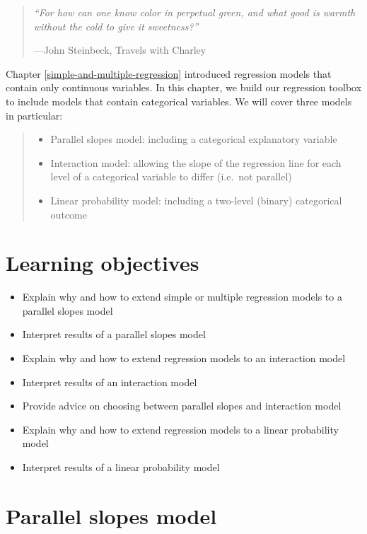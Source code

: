 \documentclass[
]{book}
\providecommand{\tightlist}{%
  \setlength{\itemsep}{0pt}\setlength{\parskip}{0pt}}
\begin{document}
\begin{quote}
\emph{``For how can one know color in perpetual green, and what good is warmth without the cold to give it sweetness?''}

---John Steinbeck, Travels with Charley
\end{quote}

Chapter \ref{simple-and-multiple-regression} introduced regression models that contain only continuous variables. In this chapter, we build our regression toolbox to include models that contain categorical variables. We will cover three models in particular:

\begin{quote}
\begin{itemize}
\tightlist
\item
  Parallel slopes model: including a categorical explanatory variable
\item
  Interaction model: allowing the slope of the regression line for each level of a categorical variable to differ (i.e.~not parallel)
\item
  Linear probability model: including a two-level (binary) categorical outcome
\end{itemize}
\end{quote}

\hypertarget{lo7}{%
\section{Learning objectives}\label{lo7}}

\begin{itemize}
\tightlist
\item
  Explain why and how to extend simple or multiple regression models to a parallel slopes model
\item
  Interpret results of a parallel slopes model
\item
  Explain why and how to extend regression models to an interaction model
\item
  Interpret results of an interaction model
\item
  Provide advice on choosing between parallel slopes and interaction model
\item
  Explain why and how to extend regression models to a linear probability model
\item
  Interpret results of a linear probability model
\end{itemize}

\hypertarget{parallel-slopes-model}{%
\section{Parallel slopes model}\label{parallel-slopes-model}}
\end{document}
